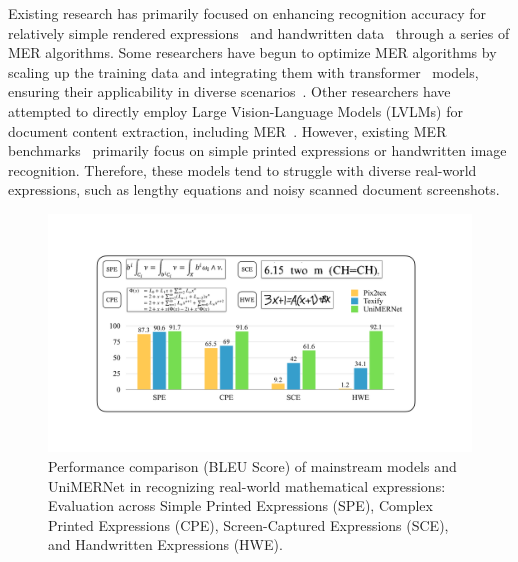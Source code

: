 \documentclass[runningheads]{llncs}
\begin{document}
Existing research has primarily focused on enhancing recognition accuracy for relatively simple rendered expressions~\cite{deng2017image} and handwritten data~\cite{mahdavi2019icdar,le2019pattern,wu2020handwritten,zhao2021handwritten} through a series of MER algorithms. 
Some researchers have begun to optimize MER algorithms by scaling up the training data and integrating them with transformer~\cite{vaswani2017attention} models, ensuring their applicability in diverse scenarios~\cite{kim2022ocr,pix2tex2022,blecher2023nougat,texify2023}. 
Other researchers have attempted to directly employ Large Vision-Language Models (LVLMs) for document content extraction, including MER~\cite{wei2023vary, blecher2023nougat}.
However, existing MER benchmarks~\cite{deng2017image,mahdavi2019icdar} primarily focus on simple printed expressions or handwritten image recognition.
Therefore, these models tend to struggle with diverse real-world expressions, such as lengthy equations and noisy scanned document screenshots. 



\begin{figure}[t]
  \centering
	\includegraphics[width=0.95 \linewidth]{figures/fig1_bleu.pdf}
    \caption{Performance comparison (BLEU Score) of mainstream models and UniMERNet in recognizing real-world mathematical expressions: Evaluation across Simple Printed Expressions (SPE), Complex Printed Expressions (CPE), Screen-Captured Expressions (SCE), and Handwritten Expressions (HWE).}
  \label{fig:fig1_introduction}
  \vspace{-2pt}
\end{figure}
\end{document}

